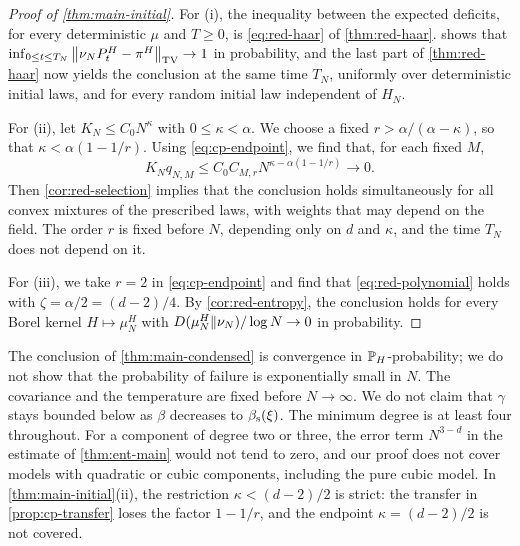 \begin{proof}[Proof of \cref{thm:main-initial}]
For (i), the inequality between the expected deficits, for every deterministic $\mu$ and $T\ge0$, is \eqref{eq:red-haar} of \cref{thm:red-haar}.  shows that $\inf_{0\le t\le T_N}\left\lVert\nu_NP^H_t-\pi^H\right\rVert_{\mathrm{TV}}\to1$ in probability, and the last part of \cref{thm:red-haar} now yields the conclusion at the same time $T_N$, uniformly over deterministic initial laws, and for every random initial law independent of $H_N$.

For (ii), let $K_N\le C_0N^\kappa$ with $0\le\kappa<\alpha$. We choose a fixed $r>\alpha/(\alpha-\kappa)$, so that $\kappa<\alpha(1-1/r)$. Using \eqref{eq:cp-endpoint}, we find that, for each fixed $M$,
\begin{equation*}
K_Nq_{N,M}\le C_0C_{M,r}N^{\kappa-\alpha(1-1/r)}\longrightarrow0.
\end{equation*}
Then \cref{cor:red-selection} implies that the conclusion holds simultaneously for all convex mixtures of the prescribed laws, with weights that may depend on the field. The order $r$ is fixed before $N$, depending only on $d$ and $\kappa$, and the time $T_N$ does not depend on it.

For (iii), we take $r=2$ in \eqref{eq:cp-endpoint} and find that \eqref{eq:red-polynomial} holds with $\zeta=\alpha/2=(d-2)/4$. By \cref{cor:red-entropy}, the conclusion holds for every Borel kernel $H\mapsto\mu^H_N$ with $D(\mu^H_N\Vert\nu_N)/\log N\to0$ in probability.
\end{proof}

\begin{remark}\label{rem:cp-scope}
The conclusion of \cref{thm:main-condensed} is convergence in $\mathbb P_H$-probability; we do not show that the probability of failure is exponentially small in $N$. The covariance and the temperature are fixed before $N\to\infty$. We do not claim that $\gamma$ stays bounded below as $\beta$ decreases to $\beta_{\mathrm s}(\xi)$. The minimum degree is at least four throughout. For a component of degree two or three, the error term $N^{3-d}$ in the estimate of \cref{thm:ent-main} would not tend to zero, and our proof does not cover models with quadratic or cubic components, including the pure cubic model. In \cref{thm:main-initial}(ii), the restriction $\kappa<(d-2)/2$ is strict: the transfer in \cref{prop:cp-transfer} loses the factor $1-1/r$, and the endpoint $\kappa=(d-2)/2$ is not covered.
\end{remark}
